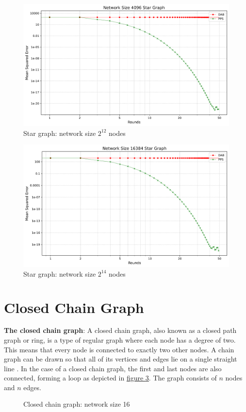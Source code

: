 \begin{figure}[H]
    \centering
    \includegraphics[scale=0.5]{figures/starGraphSimulations/DAB_vs_PPS_SG_r50_n4096.png}
    \caption{Star graph: network size $2^{12}$ nodes}
    \label{fig:4096StarGraph}
\end{figure}

\begin{figure}[H]
    \centering
    \includegraphics[scale=0.5]{figures/starGraphSimulations/DAB_vs_PPS_SG_r50_n16384.png}
    \caption{Star graph: network size $2^{14}$ nodes}
    \label{fig:16384StarGraph}
\end{figure}

\section{Closed Chain Graph}
\textbf{The closed chain graph}: A closed chain graph, also known as a closed path graph or ring, is a type of regular graph where each node has a degree of two. This means that every node is connected to exactly two other nodes. A chain graph can be drawn so that all of its vertices and edges lie on a single straight line \cite{gross1998graph}. In the case of a closed chain graph, the first and last nodes are also connected, forming a loop as depicted in \hyperref[fig:closedChainGraphDemo]{figure } \ref{fig:closedChainGraphDemo}. The graph consists of $n$ nodes and $n$ edges.
\begin{figure}[H]
    \centering
    \scalebox{0.8}{}
    \caption{Closed chain graph: network size 16}
    \label{fig:closedChainGraphDemo}
\end{figure}
